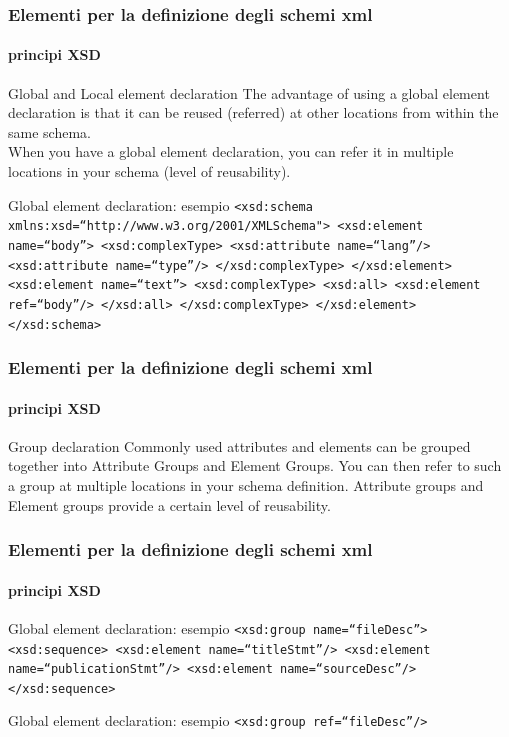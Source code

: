 
\begin{frame}
	\frametitle{Elementi per la definizione degli schemi xml}
	\framesubtitle{principi XSD}
	\addtocounter{nframe}{1}

	\begin{block}{Global and Local element declaration}
		The advantage of using a global element declaration is that it can be reused (referred) at other locations from within the same schema.
		\\ When you have a global element declaration, you can refer it in multiple locations in your schema (level of reusability).
	\end{block}

	\begin{block}{Global element declaration: esempio}
		\texttt{<xsd:schema xmlns:xsd=``http://www.w3.org/2001/XMLSchema">
			<xsd:element name=``body''>
			<xsd:complexType>
			<xsd:attribute name=``lang''/>
			<xsd:attribute name=``type''/>
			</xsd:complexType>
			</xsd:element>
			<xsd:element name=``text''>
			<xsd:complexType>
			<xsd:all>
			<xsd:element ref=``body''/>
			</xsd:all>
			</xsd:complexType>
			</xsd:element>
			</xsd:schema>}
	\end{block}

\end{frame}

\begin{frame}
	\frametitle{Elementi per la definizione degli schemi xml}
	\framesubtitle{principi XSD}
	\addtocounter{nframe}{1}

	\begin{block}{Group declaration}
		Commonly used attributes and elements can be grouped together into Attribute Groups and Element Groups. You can then refer to such a group at multiple locations in your schema definition. Attribute groups and Element groups provide a certain level of reusability.
	\end{block}

\end{frame}


\begin{frame}
	\frametitle{Elementi per la definizione degli schemi xml}
	\framesubtitle{principi XSD}
	\addtocounter{nframe}{1}


	\begin{block}{Global element declaration: esempio}
		\texttt{<xsd:group name=``fileDesc''>
			<xsd:sequence>
			<xsd:element name=``titleStmt''/>
			<xsd:element name=``publicationStmt''/>
			<xsd:element name=``sourceDesc''/>
			</xsd:sequence>
		}
	\end{block}

	\begin{block}{Global element declaration: esempio}
		\texttt{<xsd:group ref=``fileDesc''/>
		}
	\end{block}

\end{frame}

